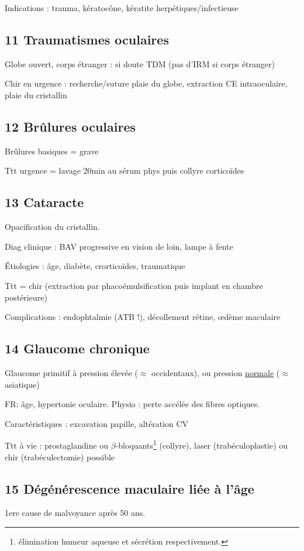\documentclass[11pt]{article}
\begin{document}
Indications : trauma, kératocône, kératite herpétiques/infectieuse
\subsection{11 Traumatismes oculaires}
\label{sec:org58c8845}
Globe ouvert, corps étranger : si doute TDM (\danger pas d'IRM si corps
étranger)

Chir en urgence : recherche/suture plaie du globe, extraction CE intraoculaire,
plaie du cristallin
\subsection{12 Brûlures oculaires}
\label{sec:org4e94127}
Brûlures basiques = grave \danger

Ttt urgence = lavage 20min au sérum phys puis collyre corticoïdes 
\subsection{13 Cataracte}
\label{sec:org6ca3f7e}
Opacification du cristallin.

Diag clinique : BAV progressive en vision de loin, lampe à fente

Étiologies : âge, diabète, crorticoïdes, traumatique

Ttt = chir (extraction par phacoémulsification puis implant en chambre
postérieure)

Complications : endophtalmie (ATB !), décollement rétine, \oe{}dème maculaire
\subsection{14 Glaucome chronique}
\label{sec:org7af61c4}

Glaucome primitif à pression élevée (\(\approx\) occidentaux), ou pression \uline{normale}
(\(\approx\) asiatique)

FR: âge, hypertonie oculaire. Physio : perte accélée des fibres optiques.

Caractéristiques : \inc excavation papille, altération CV

Ttt à vie : prostaglandine ou \(\beta\)-bloquants\footnote{\inc élimination humeur aqueuse et \dec sécrétion respectivement.} (collyre), laser
(trabéculoplastie) ou chir (trabéculectomie) possible
\subsection{15 Dégénérescence maculaire liée à l'âge}
\label{sec:org5608ae1}
1ere cause de malvoyance après 50 ans.
\end{document}
